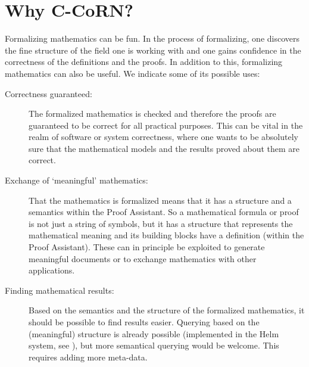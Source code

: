 \documentclass[runningheads]{llncs}
\newcommand{\ccorn}{\mbox{C-CoRN}}
\begin{document}
\section{Why {\ccorn}?\label{why}}                  
Formalizing mathematics can be fun. In the process of formalizing, one
discovers the fine structure of the field one is working with and one
gains confidence in the correctness of the definitions and the proofs.
In addition to this, formalizing mathematics can also be useful. We
indicate some of its possible uses:
\begin{description}
\item[Correctness guaranteed:] The formalized mathematics is checked
and therefore the proofs are guaranteed to be correct for all
practical purposes. This can be vital in the realm of software or
system correctness, where one wants to be absolutely sure that the
mathematical models and the results proved about them are correct.
\item[Exchange of `meaningful' mathematics:] That the mathematics is 
formalized means that it has a structure and a semantics within the
Proof Assistant. So a mathematical formula or proof is not just a
string of symbols, but it has a structure that represents the
mathematical meaning and its building blocks have a definition (within
the Proof Assistant). These can in principle be exploited to generate
meaningful documents or to exchange mathematics with other
applications.
\item[Finding mathematical results:] Based on the semantics and the
structure of the formalized mathematics, it should be possible to find
results easier. Querying based on the (meaningful) structure is
already possible (implemented in the Helm system, see
\cite{guidi2003}), but more semantical querying would be welcome. 
This requires adding more meta-data.
\end{description}
\end{document}
